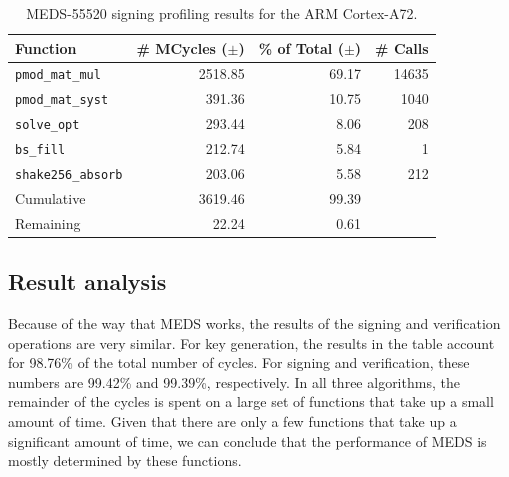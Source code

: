 \documentclass[11pt,a4paper]{report}
\theoremstyle{definition}
\begin{document}
\begin{table}
  \centering
  \caption{MEDS-55520 signing profiling results for the ARM Cortex-A72.}
  \begin{tabular}{lrrr}
    \toprule
    \textbf{Function}         & \textbf{\# MCycles} ($\pm$) & \textbf{\% of Total} ($\pm$) & \textbf{\# Calls} \\
    \midrule
    \texttt{pmod\_mat\_mul}   & 2518.85                     & 69.17                        & 14635             \\
    \texttt{pmod\_mat\_syst}  & 391.36                      & 10.75                        & 1040              \\
    \texttt{solve\_opt}       & 293.44                      & 8.06                         & 208               \\
    \texttt{bs\_fill}         & 212.74                      & 5.84                         & 1                 \\
    \texttt{shake256\_absorb} & 203.06                      & 5.58                         & 212               \\
    \midrule
    Cumulative                & 3619.46                     & 99.39                        &                   \\
    Remaining                 & 22.24                       & 0.61                         &                   \\
    \bottomrule
  \end{tabular}
  \label{tab:medssigningfunctions}
\end{table}

\subsection{Result analysis}
Because of the way that MEDS works, the results of the signing and verification operations are very similar. For key generation, the results in the table account for 98.76\% of the total number of cycles. For signing and verification, these numbers are 99.42\% and 99.39\%, respectively. In all three algorithms, the remainder of the cycles is spent on a large set of functions that take up a small amount of time. Given that there are only a few functions that take up a significant amount of time, we can conclude that the performance of MEDS is mostly determined by these functions.
\end{document}
